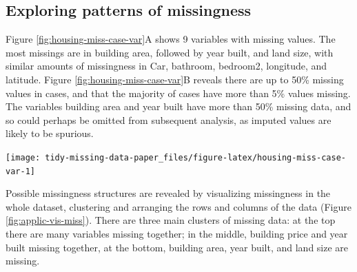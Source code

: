 \documentclass[]{article}
\let\origfigure\figure
\let\endorigfigure\endfigure
\renewenvironment{figure}[1][2] {
    \expandafter\origfigure\expandafter[H]
} {
    \endorigfigure
}
\theoremstyle{definition}
\theoremstyle{definition}
\theoremstyle{definition}
\theoremstyle{remark}
\begin{document}
\hypertarget{case-study-explore-pattern}{%
\subsection{Exploring patterns of
missingness}\label{case-study-explore-pattern}}

Figure \ref{fig:housing-miss-case-var}A shows 9 variables with missing
values. The most missings are in building area, followed by year built,
and land size, with similar amounts of missingness in Car, bathroom,
bedroom2, longitude, and latitude. Figure
\ref{fig:housing-miss-case-var}B reveals there are up to 50\% missing
values in cases, and that the majority of cases have more than 5\%
values missing. The variables building area and year built have more
than 50\% missing data, and so could perhaps be omitted from subsequent
analysis, as imputed values are likely to be spurious.

\begin{figure}

{\centering \texttt{[image: tidy-missing-data-paper\_files/figure-latex/housing-miss-case-var-1]} 

}

\caption{The amount of missings in each variable (A) and in each case (B) for Melbourne housing data. (A) Build area and year built have more than 50\% missing values, and car, bathroom, bedroom2 and longitude and latitude have about 25\% missings. (B) There are between 5 and 50\% missing values in cases. There are many missing values in the data, with the majority of missingness being in selected cases and variables.}\label{fig:housing-miss-case-var}
\end{figure}

Possible missingness structures are revealed by visualizing missingness
in the whole dataset, clustering and arranging the rows and columns of
the data (Figure \ref{fig:applic-vis-miss}). There are three main
clusters of missing data: at the top there are many variables missing
together; in the middle, building price and year built missing together,
at the bottom, building area, year built, and land size are missing.
\end{document}
